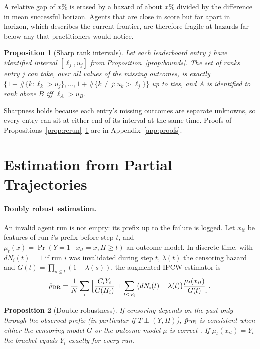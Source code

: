 \documentclass[11pt]{article}
\newtheorem{proposition}{Proposition}
\theoremstyle{definition}
\theoremstyle{remark}
\begin{document}
A relative gap of $x\%$ is erased by a hazard of about $x\%$ divided by the
difference in mean successful horizon. Agents that are close in score but far
apart in horizon, which describes the current frontier, are therefore fragile
at hazards far below any that practitioners would notice.

\begin{proposition}[Sharp rank intervals]\label{prop:rank}
Let each leaderboard entry $j$ have identified interval $[\ell_j,u_j]$ from
Proposition~\ref{prop:bounds}. The set of ranks entry $j$ can take, over all
values of the missing outcomes, is exactly
$\{1+\#\{k:\ell_k>u_j\},\dots,1+\#\{k\neq j:u_k>\ell_j\}\}$ up to ties, and $A$
is identified to rank above $B$ iff $\ell_A>u_B$.
\end{proposition}

Sharpness holds because each entry's missing outcomes are separate unknowns, so
every entry can sit at either end of its interval at the same time. Proofs of
Propositions~\ref{prop:rerun}--\ref{prop:rank} are in Appendix~\ref{app:proofs}.

\section{Estimation from Partial Trajectories}
\label{sec:est}

\paragraph{Doubly robust estimation.} An invalid agent run is not empty: its
prefix up to the failure is logged. Let $x_{it}$ be features of run $i$'s prefix
before step $t$, and $\mu_t(x)=\Pr(Y=1\mid x_{it}=x,H\ge t)$ an outcome model.
In discrete time, with $dN_i(t)=1$ if run $i$ was invalidated during step $t$,
$\lambda(t)$ the censoring hazard and $G(t)=\prod_{s\le t}(1-\lambda(s))$, the
augmented IPCW estimator \citep{robins1992recovery,tsiatis2006semiparametric} is
\begin{equation}
\hat p_{\rm DR}=\frac1N\sum_i\Big[\frac{C_iY_i}{G(H_i)}
+\sum_{t\le V_i}\big(dN_i(t)-\lambda(t)\big)\frac{\mu_t(x_{it})}{G(t)}\Big].
\label{eq:dr}
\end{equation}

\begin{proposition}[Double robustness]\label{prop:dr}
If censoring depends on the past only through the observed prefix (in
particular if $T\perp(Y,H)$), $\hat p_{\rm DR}$ is consistent when either the
censoring model $G$ or the outcome model $\mu$ is correct
\citep{bang2005doubly,tsiatis2006semiparametric}. If $\mu_t(x_{it})=Y_i$ the
bracket equals $Y_i$ exactly for every run.
\end{proposition}
\end{document}
